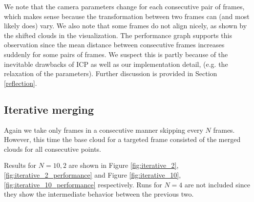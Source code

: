 \documentclass[11pt]{article}
\begin{document}
We note that the camera parameters change for each consecutive pair of frames, which makes sense because the transformation between two frames can (and most likely does) vary. We also note that some frames do not align nicely, as shown by the shifted clouds  in the visualization. The performance graph supports this observation since the mean distance between consecutive frames increases suddenly for some pairs of frames. We suspect this is partly because of the inevitable drawbacks of ICP as well as our implementation detail, (e.g. the relaxation of the parameters). Further discussion is provided in Section \ref{reflection}.

\subsection{Iterative merging}
Again we take only frames in a consecutive manner skipping every $N$ frames. However, this time the base cloud for a targeted frame consisted of the merged clouds for all consecutive points. 

Results for $N = 10, 2$ are shown in Figure \ref{fig:iterative_2}, \ref{fig:iterative_2_performance} and Figure \ref{fig:iterative_10}, \ref{fig:iterative_10_performance} respectively. Runs for $N = 4$ are not included since they show the intermediate behavior between the previous two.
\end{document}
